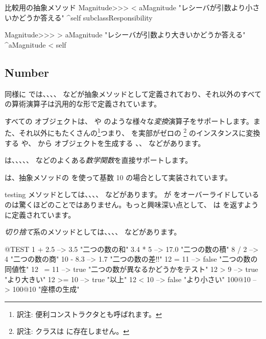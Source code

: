 \documentclass[a4paper,10pt,twoside]{book}
\begin{document}
\begin{method}{比較用の抽象メソッド}
Magnitude>>> < aMagnitude 
    "レシーバが引数より小さいかどうか答える"
    ^self subclassResponsibility

Magnitude>>> > aMagnitude 
    "レシーバが引数より大きいかどうか答える"
    ^aMagnitude < self
\end{method}

\subsection{Number}

同様に  では、、、、 などが抽象メソッドとして定義されており、それ以外のすべての算術演算子は汎用的な形で定義されています。

すべての  オブジェクトは、 や  のような様々な\emph{変換}演算子をサポートします。また、それ以外にもたくさんの\footnote{訳注: 便利コンストラクタとも呼ばれます。}つまり、 を実部がゼロの \footnote{訳注:  クラスは  に存在しません。} のインスタンスに変換する  や、 から  オブジェクトを生成する 、、 などがあります。

 は、、、、、 などのよくある\emph{数学関数}を直接サポートします。

 は、抽象メソッドの  を使って基数 10 の場合として実装されています。

testing メソッドとしては、、、、 などがあります。 が  をオーバーライドしているのは驚くほどのことではありません。もっと興味深い点として、 は  を返すように定義されています。

\emph{切り捨て}系のメソッドとしては、、、、 などがあります。

\begin{code}{@TEST}
1 + 2.5     --> 3.5             "二つの数の和"
3.4 * 5      --> 17.0           "二つの数の積"
8 / 2         --> 4                 "二つの数の商"
10 - 8.3   --> 1.7              "二つの数の差!\footnotemark!"
12 = 11    --> false           "二つの数の同値性"
12 ~= 11 --> true            "二つの数が異なるかどうかをテスト"
12 > 9      --> true            "より大きい"
12 >= 10  --> true            "以上"
12 < 10    --> false           "より小さい"
100@10   --> 100@10    "座標の生成"
\end{code}
\end{document}
